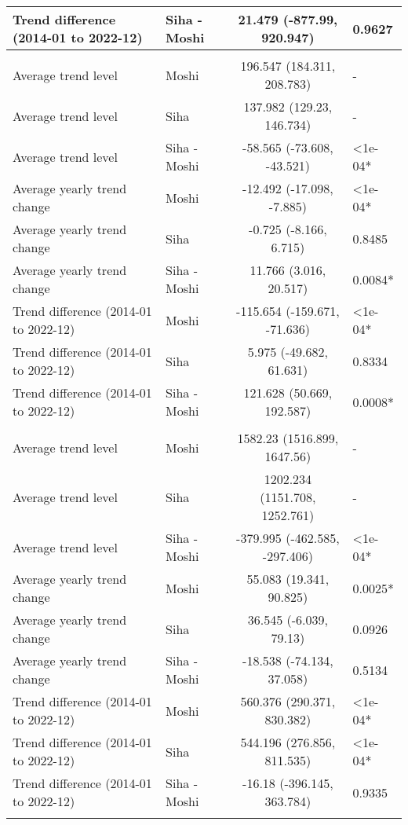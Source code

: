 \begin{longtable}{l|lcl}
Trend difference (2014-01 to 2022-12) & Siha - Moshi & 21.479 (-877.99, 920.947) & 0.9627 \\ 
\midrule\addlinespace[2.5pt]
\multicolumn{4}{l}{Trauma} \\ 
\midrule\addlinespace[2.5pt]
Average trend level & Moshi & 196.547 (184.311, 208.783) & - \\ 
Average trend level & Siha & 137.982 (129.23, 146.734) & - \\ 
Average trend level & Siha - Moshi & -58.565 (-73.608, -43.521) & <1e-04* \\ 
Average yearly trend change & Moshi & -12.492 (-17.098, -7.885) & <1e-04* \\ 
Average yearly trend change & Siha & -0.725 (-8.166, 6.715) & 0.8485 \\ 
Average yearly trend change & Siha - Moshi & 11.766 (3.016, 20.517) & 0.0084* \\ 
Trend difference (2014-01 to 2022-12) & Moshi & -115.654 (-159.671, -71.636) & <1e-04* \\ 
Trend difference (2014-01 to 2022-12) & Siha & 5.975 (-49.682, 61.631) & 0.8334 \\ 
Trend difference (2014-01 to 2022-12) & Siha - Moshi & 121.628 (50.669, 192.587) & 0.0008* \\ 
\midrule\addlinespace[2.5pt]
\multicolumn{4}{l}{Urinary Infections} \\ 
\midrule\addlinespace[2.5pt]
Average trend level & Moshi & 1582.23 (1516.899, 1647.56) & - \\ 
Average trend level & Siha & 1202.234 (1151.708, 1252.761) & - \\ 
Average trend level & Siha - Moshi & -379.995 (-462.585, -297.406) & <1e-04* \\ 
Average yearly trend change & Moshi & 55.083 (19.341, 90.825) & 0.0025* \\ 
Average yearly trend change & Siha & 36.545 (-6.039, 79.13) & 0.0926 \\ 
Average yearly trend change & Siha - Moshi & -18.538 (-74.134, 37.058) & 0.5134 \\ 
Trend difference (2014-01 to 2022-12) & Moshi & 560.376 (290.371, 830.382) & <1e-04* \\ 
Trend difference (2014-01 to 2022-12) & Siha & 544.196 (276.856, 811.535) & <1e-04* \\ 
Trend difference (2014-01 to 2022-12) & Siha - Moshi & -16.18 (-396.145, 363.784) & 0.9335 \\ 
\midrule\addlinespace[2.5pt]
\multicolumn{4}{l}{Vector-borne Infections} \\ 

\end{longtable}
